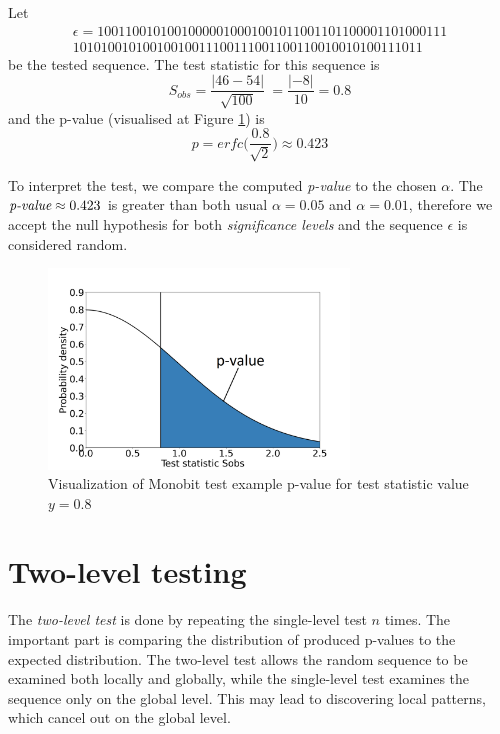 \documentclass[
  digital,     %
  oneside,     %
  nosansbold,  %
  nocolorbold, %
  nolof,         %
  nolot,         %
]{fithesis4}
\begin{document}
 Let
\[\begin{split}
    \epsilon = 10011001010010000010001001011001101100001101000111\\10101001010010010011100111001100110010010100111011
\end{split}\]
 be the tested sequence. The test statistic for this sequence is 
 \[S_{obs} = \dfrac{|46 - 54|}{\sqrt{100}}\ = \dfrac{|-8|}{10} = 0.8\]
 and the p-value (visualised at Figure \ref{fig:example}) is 
 \[p = erfc\biggl(\dfrac{0.8}{\sqrt{2}}\biggr) \approx 0.423\]

To interpret the test, we compare the computed \emph{p-value} to the chosen $\alpha$. The $\emph{p-value} \approx 0.423$ is greater than both usual $\alpha = 0.05$ and $\alpha = 0.01$, therefore we accept the null hypothesis for both \emph{significance levels} and the sequence $\epsilon$ is considered random.

\begin{figure}[h]
  \begin{center}
    \includegraphics[width=8cm]{figures/test_example.png}
  \end{center}
  \caption{Visualization of Monobit test example p-value for test statistic value $y = 0.8$}
  \label{fig:example}
\end{figure}

\section{Two-level testing} \label{chap:rand-two_level}

The \emph{two-level test} is done by repeating the single-level test $n$ times. The important part is comparing the distribution of produced p-values to the expected distribution. The two-level test allows the random sequence to be examined both locally and globally, while the single-level test examines the sequence only on the global level. This may lead to discovering local patterns, which cancel out on the global level. \cite[p. 7]{tu01_paper}
\end{document}

